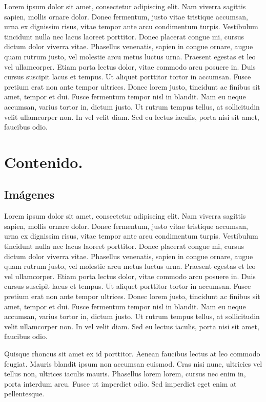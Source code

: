 	Lorem ipsum dolor sit amet, consectetur adipiscing elit. Nam viverra sagittis sapien, mollis ornare dolor. Donec fermentum, justo vitae tristique accumsan, urna ex dignissim risus, vitae tempor ante arcu condimentum turpis. Vestibulum tincidunt nulla nec lacus laoreet porttitor. Donec placerat congue mi, cursus dictum dolor viverra vitae. Phasellus venenatis, sapien in congue ornare, augue quam rutrum justo, vel molestie arcu metus luctus urna. Praesent egestas et leo vel ullamcorper. Etiam porta lectus dolor, vitae commodo arcu posuere in. Duis cursus suscipit lacus et tempus. Ut aliquet porttitor tortor in accumsan. Fusce pretium erat non ante tempor ultrices. Donec lorem justo, tincidunt ac finibus sit amet, tempor et dui. Fusce fermentum tempor nisl in blandit. Nam eu neque accumsan, varius tortor in, dictum justo. Ut rutrum tempus tellus, at sollicitudin velit ullamcorper non. In vel velit diam. Sed eu lectus iaculis, porta nisi sit amet, faucibus odio.
	


\chapter{Contenido.}

\section{Imágenes}

	Lorem ipsum dolor sit amet, consectetur adipiscing elit. Nam viverra sagittis sapien, mollis ornare dolor. Donec fermentum, justo vitae tristique accumsan, urna ex dignissim risus, vitae tempor ante arcu condimentum turpis. Vestibulum tincidunt nulla nec lacus laoreet porttitor. Donec placerat congue mi, cursus dictum dolor viverra vitae. Phasellus venenatis, sapien in congue ornare, augue quam rutrum justo, vel molestie arcu metus luctus urna. Praesent egestas et leo vel ullamcorper. Etiam porta lectus dolor, vitae commodo arcu posuere in. Duis cursus suscipit lacus et tempus. Ut aliquet porttitor tortor in accumsan. Fusce pretium erat non ante tempor ultrices. Donec lorem justo, tincidunt ac finibus sit amet, tempor et dui. Fusce fermentum tempor nisl in blandit. Nam eu neque accumsan, varius tortor in, dictum justo. Ut rutrum tempus tellus, at sollicitudin velit ullamcorper non. In vel velit diam. Sed eu lectus iaculis, porta nisi sit amet, faucibus odio.
	
	Quisque rhoncus sit amet ex id porttitor. Aenean faucibus lectus at leo commodo feugiat. Mauris blandit ipsum non accumsan euismod. Cras nisi nunc, ultricies vel tellus non, ultrices iaculis mauris. Phasellus lorem lorem, cursus nec enim in, porta interdum arcu. Fusce ut imperdiet odio. Sed imperdiet eget enim at pellentesque.
	
